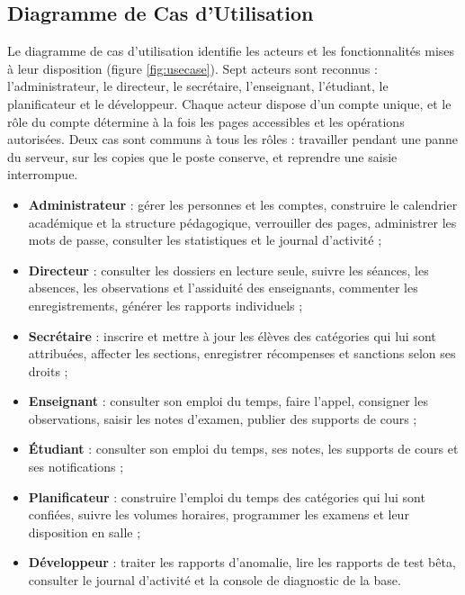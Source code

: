 \subsection{Diagramme de Cas d'Utilisation}
Le diagramme de cas d'utilisation identifie les acteurs et les fonctionnalités mises à leur disposition
(figure \ref{fig:usecase}). Sept acteurs sont reconnus : l'administrateur, le directeur, le secrétaire,
l'enseignant, l'étudiant, le planificateur et le développeur. Chaque acteur dispose d'un compte unique,
et le rôle du compte détermine à la fois les pages accessibles et les opérations autorisées. Deux cas
sont communs à tous les rôles : travailler pendant une panne du serveur, sur les copies que le poste
conserve, et reprendre une saisie interrompue.

\begin{itemize}
    \item \textbf{Administrateur} : gérer les personnes et les comptes, construire le calendrier
          académique et la structure pédagogique, verrouiller des pages, administrer les mots de passe,
          consulter les statistiques et le journal d'activité ;
    \item \textbf{Directeur} : consulter les dossiers en lecture seule, suivre les séances, les
          absences, les observations et l'assiduité des enseignants, commenter les enregistrements,
          générer les rapports individuels ;
    \item \textbf{Secrétaire} : inscrire et mettre à jour les élèves des catégories qui lui sont
          attribuées, affecter les sections, enregistrer récompenses et sanctions selon ses droits ;
    \item \textbf{Enseignant} : consulter son emploi du temps, faire l'appel, consigner les
          observations, saisir les notes d'examen, publier des supports de cours ;
    \item \textbf{Étudiant} : consulter son emploi du temps, ses notes, les supports de cours et ses
          notifications ;
    \item \textbf{Planificateur} : construire l'emploi du temps des catégories qui lui sont confiées,
          suivre les volumes horaires, programmer les examens et leur disposition en salle ;
    \item \textbf{Développeur} : traiter les rapports d'anomalie, lire les rapports de test bêta,
          consulter le journal d'activité et la console de diagnostic de la base.
\end{itemize}

